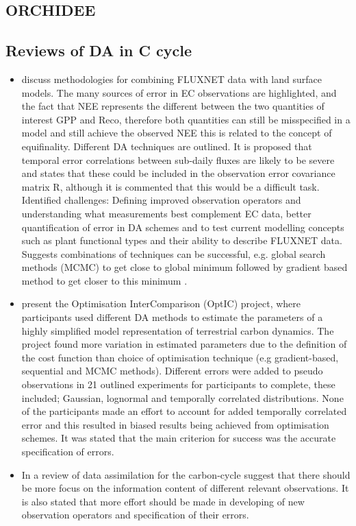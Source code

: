\documentclass[12pt, a4paper]{article}
\begin{document}
\subsection{ORCHIDEE}

\subsection{Reviews of DA in C cycle}

\begin{itemize}

\item \citet{williams2009improving} discuss methodologies for combining FLUXNET data with land surface models. The many sources of error in EC observations are highlighted, and the fact that NEE represents the different between the two quantities of interest GPP and Reco, therefore both quantities can still be misspecified in a model and still achieve the observed NEE this is related to the concept of equifinality.  Different DA techniques are outlined. It is proposed that temporal error correlations between sub-daily fluxes are likely to be severe and states that these could be included in the observation error covariance matrix R, although it is commented that this would be a difficult task. Identified challenges: Defining improved observation operators and understanding what measurements best complement EC data, better quantification of error in DA schemes and to test current modelling concepts such as plant functional types and their ability to describe FLUXNET data. Suggests combinations of techniques can be successful, e.g. global search methods (MCMC) to get close to global minimum followed by gradient based method to get closer to this minimum \citep{vrugt2005improved}.  

\item \citet{trudinger2007optic} present the Optimisation InterComparison (OptIC) project, where participants used different DA methods to estimate the parameters of a highly simplified model representation of terrestrial carbon dynamics. The project found more variation in estimated parameters due to the definition of the cost function than choice of optimisation technique (e.g gradient-based, sequential and MCMC methods). Different errors were added to pseudo observations in 21 outlined experiments for participants to complete, these included; Gaussian, lognormal and temporally correlated distributions. None of the participants made an effort to account for added temporally correlated error and this resulted in biased results being achieved from optimisation schemes. It was stated that the main criterion for success was the accurate specification of errors. 

\item In a review of data assimilation for the carbon-cycle \citet{rayner2010current} suggest that there should be more focus on the information content of different relevant observations. It is also stated that more effort should be made in developing of new observation operators and specification of their errors.

\end{itemize}


{}
\end{document}
